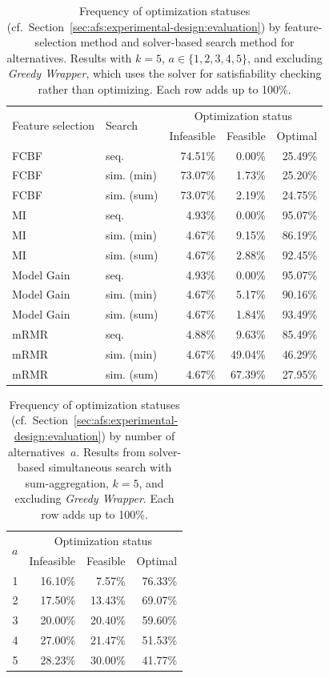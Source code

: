 \documentclass{article}
\theoremstyle{definition}
\begin{document}
\begin{table}[t]
	\centering
	\begin{tabular}{llrrr}
		\toprule
		\multirow{2}{*}{Feature selection} & \multirow{2}{*}{Search} & \multicolumn{3}{c}{Optimization status} \\
		\cmidrule(lr){3-5}
		& & Infeasible & Feasible & Optimal \\
		\midrule
		FCBF & seq. & 74.51\% & 0.00\% & 25.49\% \\
		FCBF & sim. (min) & 73.07\% & 1.73\% & 25.20\% \\
		FCBF & sim. (sum) & 73.07\% & 2.19\% & 24.75\% \\
		MI & seq. & 4.93\% & 0.00\% & 95.07\% \\
		MI & sim. (min) & 4.67\% & 9.15\% & 86.19\% \\
		MI & sim. (sum) & 4.67\% & 2.88\% & 92.45\% \\
		Model Gain & seq. & 4.93\% & 0.00\% & 95.07\% \\
		Model Gain & sim. (min) & 4.67\% & 5.17\% & 90.16\% \\
		Model Gain & sim. (sum) & 4.67\% & 1.84\% & 93.49\% \\
		mRMR & seq. & 4.88\% & 9.63\% & 85.49\% \\
		mRMR & sim. (min) & 4.67\% & 49.04\% & 46.29\% \\
		mRMR & sim. (sum) & 4.67\% & 67.39\% & 27.95\% \\
		\bottomrule
	\end{tabular}
	\caption{
		Frequency of optimization statuses (cf.~Section~\ref{sec:afs:experimental-design:evaluation}) by feature-selection method and solver-based search method for alternatives.
		Results with $k=5$, $a \in \{1,2,3,4,5\}$, and excluding \emph{Greedy Wrapper}, which uses the solver for satisfiability checking rather than optimizing.
		Each row adds up to 100\%.
	}
	\label{tab:afs:impact-search-fs-method-optimization-status}
\end{table}

\begin{table}[t]
	\centering
	\begin{tabular}{rrrr}
		\toprule
		\multirow{2}{*}{$a$} & \multicolumn{3}{c}{Optimization status} \\
		\cmidrule(lr){2-4}
		& Infeasible & Feasible & Optimal \\
		\midrule
		1 & 16.10\% & 7.57\% & 76.33\% \\
		2 & 17.50\% & 13.43\% & 69.07\% \\
		3 & 20.00\% & 20.40\% & 59.60\% \\
		4 & 27.00\% & 21.47\% & 51.53\% \\
		5 & 28.23\% & 30.00\% & 41.77\% \\
		\bottomrule
	\end{tabular}
	\caption{
		Frequency of optimization statuses (cf.~Section~\ref{sec:afs:experimental-design:evaluation}) by number of alternatives~$a$.
		Results from solver-based simultaneous search with sum-aggregation, $k=5$, and excluding \emph{Greedy Wrapper}.
		Each row adds up to 100\%.
	}
	\label{tab:afs:impact-num-alternatives-optimization-status}
\end{table}
\end{document}
